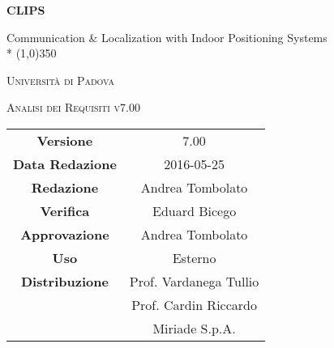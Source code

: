 \documentclass[a4paper,12pt]{article}
\author{Oscar Elia Conti, Marco Zanella}
\date{9/12/2015}
\begin{document}
	\begin{titlepage}
		\centering
		{\huge\bfseries CLIPS\par}
	Communication \& Localization with Indoor Positioning Systems \\*
	\line(1,0){350} \\
	{\scshape\LARGE Università di Padova \par}
	\vspace{1cm}
	{\scshape\Large Analisi dei Requisiti v7.00\par}
	\logo
	\newpage
		\begin{tabular}{c|c}
			{\hfill \textbf{Versione}} 		& 7.00				\\
			{\hfill\textbf{Data Redazione}} 	& 2016-05-25	  		\\
			{\hfill\textbf{Redazione}}		& Andrea Tombolato	\\
			{\hfill\textbf{Verifica}} 		& Eduard Bicego		\\
			{\hfill\textbf{Approvazione}} 		& Andrea Tombolato		\\
			{\hfill\textbf{Uso}} 			& Esterno			\\
			{\hfill\textbf{Distribuzione}} 		& Prof. Vardanega Tullio 	\\
								& Prof. Cardin Riccardo 	\\
								& Miriade S.p.A. 		\\
		\end{tabular}
	\end{titlepage}
	\newpage
		\pagestyle{myfront}
		

	\newpage
		\tableofcontents
	\newpage
		\listoftables
	\newpage
		\listoffigures
	\label{LastFrontPage}

	\newpage
	\pagestyle{mymain}
		
	\newpage
		
	\newpage
		
	\newpage
		
	\newpage
		
	\label{LastPage}
\end{document}
